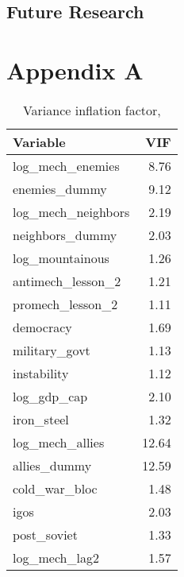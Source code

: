\documentclass{article}
\begin{document}
\subsection{Future Research}

\newpage

\printbibliography[heading=bibnumbered]
\newpage
\appendix
\centering
\section*{Appendix A}
\begin{table}[h]
	\centering
	\caption{Variance inflation factor, \citet{sechser2010army}}
	\begin{tabular}{l r}
		\hline
		\textbf{Variable} & \textbf{VIF} \\ 
		\hline
		log\_mech\_enemies & 8.76 \\ 
		enemies\_dummy & 9.12 \\ 
		log\_mech\_neighbors & 2.19 \\ 
		neighbors\_dummy & 2.03 \\ 
		log\_mountainous & 1.26 \\ 
		antimech\_lesson\_2 & 1.21 \\ 
		promech\_lesson\_2 & 1.11 \\ 
		democracy & 1.69 \\ 
		military\_govt & 1.13 \\ 
		instability & 1.12 \\ 
		log\_gdp\_cap & 2.10 \\ 
		iron\_steel & 1.32 \\ 
		log\_mech\_allies & 12.64 \\ 
		allies\_dummy & 12.59 \\ 
		cold\_war\_bloc & 1.48 \\ 
		igos & 2.03 \\ 
		post\_soviet & 1.33 \\ 
		log\_mech\_lag2 & 1.57 \\ 
		\hline
	\end{tabular}
\end{table}
\end{document}
